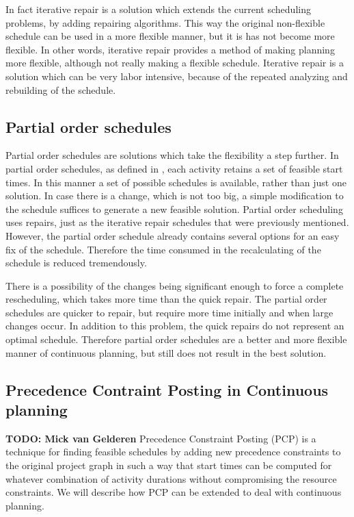 \documentclass{article}
\newcommand{\TODO}[1]{{\color{red}\textbf{TODO: #1}}}
\begin{document}
In fact iterative repair is a solution which extends the current scheduling problems, by adding repairing algorithms.
This way the original non-flexible schedule can be used in a more flexible manner, but it is has not become more flexible.
In other words, iterative repair provides a method of making planning more flexible, although not really making a flexible schedule.
Iterative repair is a solution which can be very labor intensive, because of the repeated analyzing and rebuilding of the schedule.

\subsection{Partial order schedules}
Partial order schedules are solutions which take the flexibility a step further.
In partial order schedules, as defined in \cite{policella07}, each activity retains a set of feasible start times.
In this manner a set of possible schedules is available, rather than just one solution.
In case there is a change, which is not too big, a simple modification to the schedule suffices to generate a new feasible solution.
Partial order scheduling uses repairs, just as the iterative repair schedules that were previously mentioned.
However, the partial order schedule already contains several options for an easy fix of the schedule.
Therefore the time consumed in the recalculating of the schedule is reduced tremendously.

There is a possibility of the changes being significant enough to force a complete rescheduling, which takes more time than the quick repair.
The partial order schedules are quicker to repair, but require more time initially and when large changes occur.
In addition to this problem, the quick repairs do not represent an optimal schedule.
Therefore partial order schedules are a better and more flexible manner of continuous planning, but still does not result in the best solution. 


\subsection{Precedence Contraint Posting in Continuous planning}
\TODO{Mick van Gelderen}
Precedence Constraint Posting (PCP) is a technique for finding feasible schedules by adding new precedence constraints to the original project graph in such a way that start times can be computed for whatever combination of activity durations without compromising the resource constraints. We will describe how PCP can be extended to deal with continuous planning. 
\end{document}
